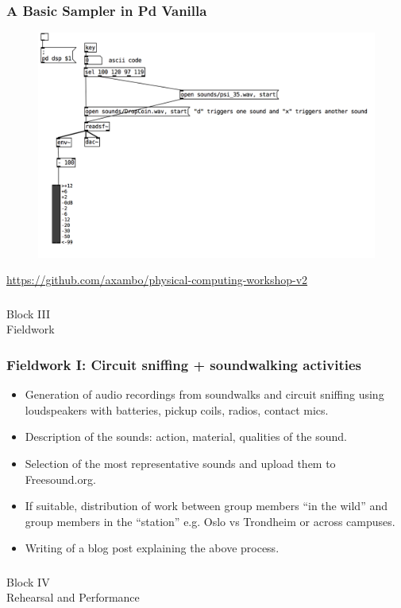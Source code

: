\documentclass[screen, aspectratio=169]{beamer}
\begin{document}
%
\begin{frame}
  \frametitle{A Basic Sampler in Pd Vanilla}
   \begin{figure}
	\includegraphics[scale=0.3]{img/Pd-basic-sampler.png}
\end{figure}
{\tiny
\url{https://github.com/axambo/physical-computing-workshop-v2}
}
\end{frame}
%

\usebackgroundtemplate{}
\begin{frame}
\frametitle{}
{\huge Block III\\Fieldwork}
\end{frame}

\begin{frame}
  \frametitle{Fieldwork I: Circuit sniffing + soundwalking activities}
        \begin{itemize}
	\item Generation of audio recordings from soundwalks and circuit sniffing using loudspeakers with batteries, pickup coils, radios, contact mics.
	\item Description of the sounds: action, material, qualities of the sound. 
	\item Selection of the most representative sounds and upload them to Freesound.org.
	\item If suitable, distribution of work between group members ``in the wild'' and group members in the ``station'' e.g. Oslo vs Trondheim or across campuses. 
	\item Writing of a blog post explaining the above process.
    \end{itemize} 
\end{frame}

\usebackgroundtemplate{}
\begin{frame}
\frametitle{}
{\huge Block IV\\Rehearsal and Performance}
\end{frame}
\end{document}

